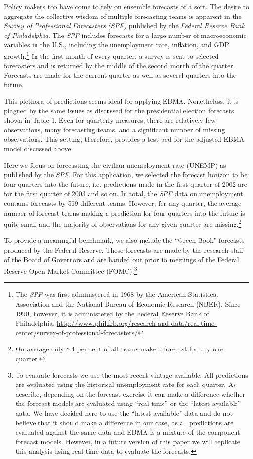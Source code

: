 \documentclass[12pt,fullpage,endnotes]{article}
\begin{document}
Policy makers too have come to rely on ensemble forecasts of a sort.
The desire to aggregate the collective wisdom of multiple forecasting
teams is apparent in the \textit{Survey of Professional Forecasters
  (SPF)} published by the \textit{Federal Reserve Bank of
  Philadelphia}.  The \textit{SPF} includes forecasts for a large
number of macroeconomic variables in the U.S., including the
unemployment rate, inflation, and GDP growth.\footnote{The
  \textit{SPF} was first administered in 1968 by the American
  Statistical Association and the National Bureau of Economic Research
  (NBER).  Since 1990, however, it is administered by the Federal
  Reserve Bank of Philadelphia.
  \url{http://www.phil.frb.org/research-and-data/real-time-center/survey-of-professional-forecasters/}}
In the first month of every quarter, a survey is sent to selected
forecasters and is returned by the middle of the second month of the
quarter. Forecasts are made for the current quarter as well as several
quarters into the future.

This plethora of predictions seems ideal for applying EBMA.  Nonetheless,
it is plagued by the same issues as discussed for the presidential
election forecasts shown in Table 1.  Even for quarterly measures,
there are relatively few observations, many forecasting teams, and a
significant number of missing observations.  This setting, therefore,
provides a test bed for the adjusted EBMA model discussed
above.

Here we focus on forecasting the civilian unemployment rate (UNEMP) as
published by the \textit{SPF}. For this application, we selected the
forecast horizon to be four quarters into the future, i.e. predictions
made in the first quarter of 2002 are for the first quarter of 2003
and so on. In total, the \textit{SPF} data on unemployment contains
forecasts by 569 different teams. However, for any quarter, the
average number of forecast teams making a prediction for four quarters
into the future is quite small and the majority of observations for
any given quarter are missing.\footnote{On average only 8.4 per cent
  of all teams make a forecast for any one quarter.}

To provide a meaningful benchmark, we also include the ``Green Book''
forecasts produced by the Federal Reserve. These forecasts are made by
the research staff of the Board of Governors and are handed out prior
to meetings of the Federal Reserve Open Market Committee
(FOMC).\footnote{To evaluate forecasts we use the most recent vintage
  available. All predictions are evaluated using the historical
  unemployment rate for each quarter. As \citet{Croushore:Stark:2001}
  describe, depending on the forecast exercise it can make a
  difference whether the forecast models are evaluated using
  ``real-time'' or the ``latest available'' data. We have decided here
  to use the ``latest available'' data and do not believe that it
  should make a difference in our case, as all predictions are
  evaluated against the same data and EBMA is a mixture of the
  component forecast models. However, in a future version of this
  paper we will replicate this analysis using real-time data to
  evaluate the forecasts.} %
\end{document}
